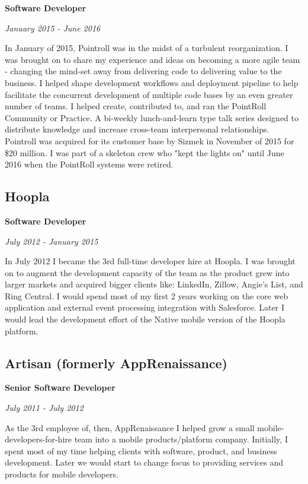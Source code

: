 \documentclass[12pt letterpaper notitlepage]{article}
\begin{document}
\textbf{Software Developer}

\emph{January 2015 - June 2016}

In January of 2015, Pointroll was in the midst of a turbulent reorganization. I was brought on to share my experience and ideas on becoming a more agile team - changing the mind-set away from delivering code to delivering value to the business. I helped shape development workflows and deployment pipeline to help facilitate the concurrent development of multiple code bases by an even greater number of teams. I helped create, contributed to, and ran the PointRoll Community or Practice. A bi-weekly lunch-and-learn type talk series designed to distribute knowledge and increase cross-team interpersonal relationships. Pointroll was acquired for its customer base by Sizmek in November of 2015 for \$20 million. I was part of a skeleton crew who "kept the lights on" until June 2016 when the PointRoll systems were retired.

\subsection*{Hoopla}
\label{sec:org6d03a68}

\textbf{Software Developer}

\emph{July 2012 - January 2015}

In July 2012 I became the 3rd full-time developer hire at Hoopla. I was brought on to augment the development capacity of the team as the product grew into larger markets and acquired bigger clients like: LinkedIn, Zillow, Angie's List, and Ring Central. I would spend most of my first 2 years working on the core web application and external event processing integration with Salesforce. Later I would lead the development effort of the Native mobile version of the Hoopla platform.

\subsection*{Artisan (formerly AppRenaissance)}
\label{sec:orgcf2d09f}

\textbf{Senior Software Developer}

\emph{July 2011 - July 2012}

As the 3rd employee of, then, AppRenaissance I helped grow a small mobile-developers-for-hire team into a mobile products/platform company. Initially, I spent most of my time helping clients with software, product, and business development. Later we would start to change focus to providing services and products for mobile developers.
\end{document}
